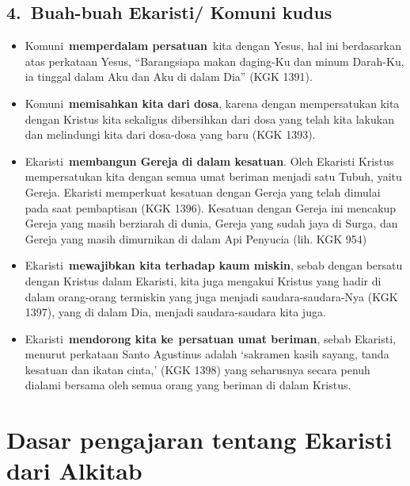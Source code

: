 \subsection[4.~Buah{}-buah Ekaristi/ Komuni
kudus]{4.~\textbf{Buah-buah Ekaristi/ Komuni kudus}}
\begin{itemize}
\item Komuni~\textbf{memperdalam persatuan}~kita dengan Yesus, hal ini
berdasarkan atas perkataan Yesus, {\textquotedblleft}Barangsiapa makan
daging-Ku dan minum Darah-Ku, ia tinggal dalam Aku dan Aku di dalam
Dia{\textquotedblright} (KGK 1391).
\item Komuni~\textbf{memisahkan kita dari dosa}, karena dengan
mempersatukan kita dengan Kristus kita sekaligus dibersihkan dari dosa
yang telah kita lakukan dan melindungi kita dari dosa-dosa yang baru
(KGK 1393).
\item Ekaristi~\textbf{membangun Gereja di dalam kesatuan}. Oleh
Ekaristi Kristus mempersatukan kita dengan semua umat beriman menjadi
satu Tubuh, yaitu Gereja. Ekaristi memperkuat kesatuan dengan Gereja
yang telah dimulai pada saat pembaptisan (KGK 1396). Kesatuan dengan
Gereja ini mencakup Gereja yang masih berziarah di dunia, Gereja yang
sudah jaya di Surga, dan Gereja yang masih dimurnikan di dalam Api
Penyucia (lih. KGK 954)
\item Ekaristi~\textbf{mewajibkan kita terhadap kaum miskin}, sebab
dengan bersatu dengan Kristus dalam Ekaristi, kita juga mengakui
Kristus yang hadir di dalam orang-orang termiskin yang juga menjadi
saudara-saudara-Nya (KGK 1397), yang di dalam Dia, menjadi
saudara-saudara kita juga.
\item Ekaristi~\textbf{mendorong kita ke}~\textbf{persatuan umat
beriman}, sebab Ekaristi, menurut perkataan Santo Agustinus adalah
{\textquoteleft}sakramen kasih sayang, tanda kesatuan dan ikatan
cinta,{\textquoteright} (KGK 1398) yang seharusnya secara penuh dialami
bersama oleh semua orang yang beriman di dalam Kristus.
\end{itemize}
\section[Dasar pengajaran tentang Ekaristi dari Alkitab]{Dasar
pengajaran tentang Ekaristi dari Alkitab}
